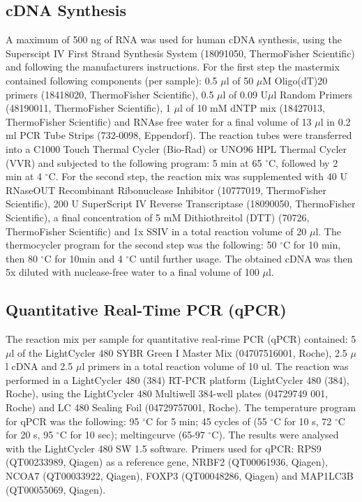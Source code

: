 \documentclass[oneside, 10pt, a4paper, twocolumn]{article}
\begin{document}
{\subsection{cDNA Synthesis}
A maximum of 500 ng of RNA was used for human cDNA synthesis, using the Superscipt IV First Strand Synthesis System (18091050, ThermoFisher Scientific) and following the manufacturers instructions. For the first step the mastermix contained following components (per sample): 0.5 $\mu$l of 50 $\mu$M Oligo(dT)20 primers (18418020, ThermoFisher Scientific), 0.5 $\mu$l of 0.09 U$\mu$l Random Primers (48190011, ThermoFisher Scientific), 1 $\mu$l of 10 mM dNTP mix (18427013, ThermoFisher Scientific) and RNAse free water for a final volume of 13 $\mu$l in 0.2 ml PCR Tube Strips (732-0098, Eppendorf). The reaction tubes were transferred into a C1000 Touch Thermal Cycler (Bio-Rad) or UNO96 HPL Thermal Cycler (VVR) and subjected to the following program: 5 min at 65 $^\circ$C, followed by 2 min at 4 $^\circ$C. For the second step, the  reaction mix was supplemented with 40 U RNaseOUT Recombinant Ribonuclease Inhibitor (10777019, ThermoFisher Scientific), 200 U SuperScript IV Reverse Transcriptase (18090050, ThermoFisher Scientific),  a final concentration of 5 mM Dithiothreitol (DTT) (70726, ThermoFisher Scientific) and 1x SSIV in a total reaction volume of 20 $\mu$l. The thermocycler program for the second step was the following: 50 $^\circ$C for 10 min, then 80 $^\circ$C for 10min and 4 $^\circ$C until further usage. The obtained cDNA was then 5x diluted with nuclease-free water to a final volume of 100 $\mu$l.

\subsection{Quantitative Real-Time PCR (qPCR)} 
The reaction mix per sample for quantitative real-rime PCR (qPCR) contained: 5$\mu$l of the LightCycler 480 SYBR Green I Master Mix (04707516001, Roche), 2.5 $\mu$l cDNA and 2.5 $\mu$l primers in a total reaction volume of 10 ul. The reaction was performed in a LightCycler 480 (384) RT-PCR platform (LightCycler 480 (384), Roche), using the LightCycler 480 Multiwell 384-well plates (04729749 001, Roche) and LC 480 Sealing Foil (04729757001, Roche). The temperature program for qPCR was the following: 95 $^\circ$C for 5 min; 45 cycles of (55 $^\circ$C for 10 s, 72 $^\circ$C for 20 s, 95 $^\circ$C for 10 sec); meltingcurve (65-97 $^\circ$C). The results were analysed with the LightCycler 480 SW 1.5 software. Primers used for qPCR: RPS9 (QT00233989, Qiagen) as a reference gene, NRBF2 (QT00061936, Qiagen), NCOA7 (QT00033922, Qiagen),  FOXP3 (QT00048286, Qiagen) and MAP1LC3B (QT00055069, Qiagen).

}
\end{document}

